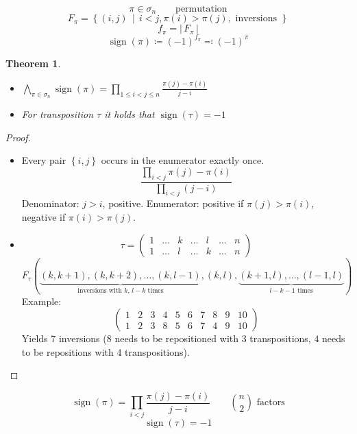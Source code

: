 \documentclass[a4paper,landscape,twocolumn]{article}
\newcommand\set[1]{\left\{#1\right\}}
\newcommand\setdef[2]{\left\{#1\,\middle|\,#2\right\}}
\newcommand\card[1]{\left|\,#1\,\right|}
\newtheorem{theorem}{Theorem}
\DeclareMathOperator\sign{sign}
\begin{document}
\[ \pi \in \sigma_n \qquad \text{permutation} \]
\[ F_\pi = \setdef{(i,j)}{i < j, \pi(i) > \pi(j), \text{ inversions }} \]
\[ f_\pi = \card{F_\pi} \]
\[ \sign(\pi) \coloneqq (-1)^{f_\pi} \eqqcolon (-1)^\pi \]

\begin{theorem}
  \label{satz-7.16}
  \begin{itemize}
    \item $\bigwedge_{\pi \in \sigma_n} \sign(\pi) = \prod_{1 \leq i < j \leq n} \frac{\pi(j) - \pi(i)}{j - i}$
    \item For transposition $\tau$ it holds that $\sign(\tau) = -1$
  \end{itemize}
\end{theorem}
\begin{proof}
  \begin{itemize}
    \item
      Every pair $\set{i,j}$ occurs in the enumerator exactly once.
      \[ \frac{\prod_{i<j} \pi(j) - \pi(i)}{\prod_{i<j} (j - i)} \]
      Denominator: $j > i$, positive.
      Enumerator: positive if $\pi(j) > \pi(i)$, negative if $\pi(i) > \pi(j)$.
    \item
      \[
        \tau =
        \begin{pmatrix}
          1 & \ldots & k & \ldots & l & \ldots & n \\
          1 & \ldots & l & \ldots & k & \ldots & n
        \end{pmatrix}
      \] \[
        F_\tau(\underbrace{(k, k + 1), (k, k + 2), \ldots, (k, l-1)}_{\text{inversions with $k$, $l-k$ times}},
        (k,l), \underbrace{(k+1, l), \ldots, (l - 1, l)}_{l-k-1 \text{ times}})
      \]
      Example:
      \[
        \begin{pmatrix}
          1 & 2 & 3 & 4 & 5 & 6 & 7 & 8 & 9 & 10 \\
          1 & 2 & 3 & 8 & 5 & 6 & 7 & 4 & 9 & 10
        \end{pmatrix}
      \]
      Yields $7$ inversions ($8$ needs to be repositioned with 3 transpositions, $4$ needs to be repositions with 4 transpositions).
  \end{itemize}
\end{proof}

\[ \sign(\pi) = \prod_{i < j} \frac{\pi(j) - \pi(i)}{j - i} \qquad {n \choose 2} \text{ factors} \]
\[ \sign(\tau) = -1 \]
\end{document}
